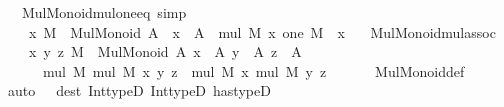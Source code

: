 \begin{isabellebody}
\ \ \ Mul{\isacharunderscore}{\kern0pt}Monoid{\isacharunderscore}{\kern0pt}mul{\isacharunderscore}{\kern0pt}one{\isacharunderscore}{\kern0pt}eq\ {\isacharbrackleft}{\kern0pt}simp{\isacharbrackright}{\kern0pt}{\isacharcolon}{\kern0pt}\isanewline
\ \ \ \ {\isachardoublequoteopen}{\isasymAnd}x{\isachardot}{\kern0pt}\ M\ {\isacharcolon}{\kern0pt}\ Mul{\isacharunderscore}{\kern0pt}Monoid\ A\ {\isasymLongrightarrow}\ x\ {\isacharcolon}{\kern0pt}\ A\ {\isasymLongrightarrow}\ mul\ M\ x\ {\isacharparenleft}{\kern0pt}one\ M{\isacharparenright}{\kern0pt}\ {\isacharequal}{\kern0pt}\ x{\isachardoublequoteclose}\isanewline
\ \ \ Mul{\isacharunderscore}{\kern0pt}Monoid{\isacharunderscore}{\kern0pt}mul{\isacharunderscore}{\kern0pt}assoc{\isacharcolon}{\kern0pt}\isanewline
\ \ \ \ {\isachardoublequoteopen}{\isasymAnd}x\ y\ z{\isachardot}{\kern0pt}\ {\isasymlbrakk}M\ {\isacharcolon}{\kern0pt}\ Mul{\isacharunderscore}{\kern0pt}Monoid\ A{\isacharsemicolon}{\kern0pt}\ x\ {\isacharcolon}{\kern0pt}\ A{\isacharsemicolon}{\kern0pt}\ y\ {\isacharcolon}{\kern0pt}\ A{\isacharsemicolon}{\kern0pt}\ z\ {\isacharcolon}{\kern0pt}\ A{\isasymrbrakk}\ {\isasymLongrightarrow}\isanewline
\ \ \ \ \ \ mul\ M\ {\isacharparenleft}{\kern0pt}mul\ M\ x\ y{\isacharparenright}{\kern0pt}\ z\ {\isacharequal}{\kern0pt}\ mul\ M\ x\ {\isacharparenleft}{\kern0pt}mul\ M\ y\ z{\isacharparenright}{\kern0pt}{\isachardoublequoteclose}\isanewline
\ \ \isanewline
%
\isadelimproof
\ \ %
\endisadelimproof
%
\isatagproof
{}\isamarkupfalse%
\ Mul{\isacharunderscore}{\kern0pt}Monoid{\isacharunderscore}{\kern0pt}def\ \isamarkupfalse%
\ {\isacharparenleft}{\kern0pt}auto\ {}\ {}\ dest{\isacharbang}{\kern0pt}{\isacharcolon}{\kern0pt}\ Int{\isacharunderscore}{\kern0pt}typeD{}\ Int{\isacharunderscore}{\kern0pt}typeD{}\ has{\isacharunderscore}{\kern0pt}typeD{\isacharparenright}{\kern0pt}%
\endisatagproof
{\isafoldproof}%
%
\isadelimproof
\isanewline
%
\endisadelimproof
\isanewline
%
\isadelimtheory
\isanewline
%
\endisadelimtheory
%
\isatagtheory
{}\isamarkupfalse%
%
\endisatagtheory
{\isafoldtheory}%
%
\isadelimtheory
%
\endisadelimtheory
%
\end{isabellebody}%
\endinput
